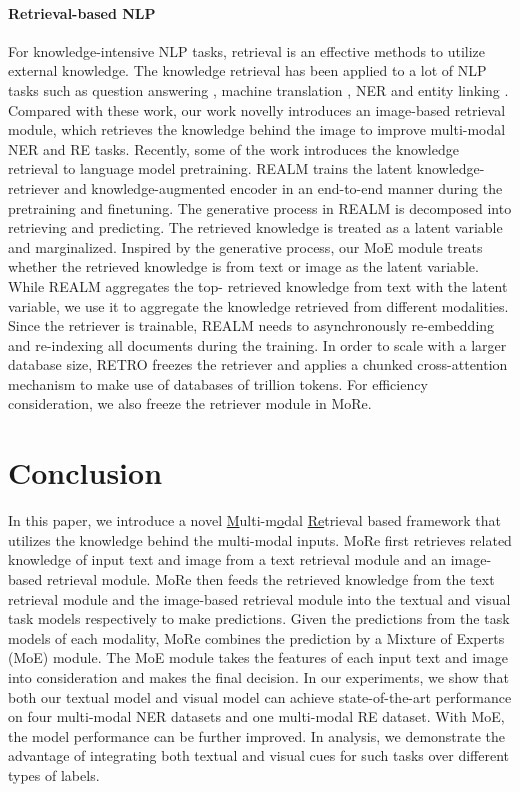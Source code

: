 \documentclass[11pt]{article}
\begin{document}
\paragraph{Retrieval-based NLP}
For knowledge-intensive NLP tasks, retrieval is an effective methods to utilize external knowledge. The knowledge retrieval has been applied to a lot of NLP tasks such as question answering \cite{liu2020k,karpukhin-etal-2020-dense, NEURIPS2020_6b493230,xu2021human, izacard-grave-2021-leveraging}, machine translation \cite{gu2018search,zhang-etal-2018-guiding,xu-etal-2020-boosting}, NER \cite{wang-etal-2021-improving,wang-etal-2022-damo,zhang-etal-2022-domain} and entity linking \cite{zhang-etal-2022-iclr,huang-etal-2022-nlpcc}. Compared with these work, our work novelly introduces an image-based retrieval module, which retrieves the knowledge behind the image to improve multi-modal NER and RE tasks. Recently, some of the work introduces the knowledge retrieval to language model pretraining. REALM \cite{guu2020realm} trains the latent knowledge-retriever and knowledge-augmented encoder in an end-to-end manner during the pretraining and finetuning. The generative process in REALM is decomposed into retrieving and predicting. The retrieved knowledge is treated as a latent variable and marginalized. Inspired by the generative process, our MoE module treats whether the retrieved knowledge is from text or image as the latent variable. While REALM aggregates the top- retrieved knowledge from text with the latent variable, we use it to aggregate the knowledge retrieved from different modalities. Since the retriever is trainable, REALM needs to asynchronously re-embedding and re-indexing all documents during the training. In order to scale with a larger database size, RETRO \cite{DBLP:journals/corr/abs-2112-04426} freezes the retriever and applies a chunked cross-attention mechanism to make use of databases of trillion tokens. For efficiency consideration, we also freeze the retriever module in MoRe. 

\section{Conclusion}
In this paper, we introduce a novel \underline{M}ulti-m\underline{o}dal \underline{Re}trieval based framework that utilizes the knowledge behind the multi-modal inputs. MoRe first retrieves related knowledge of input text and image from a text retrieval module and an image-based retrieval module. MoRe then feeds the retrieved knowledge from the text retrieval module and the image-based retrieval module into the textual and visual task models respectively to make predictions. Given the predictions from the task models of each modality, MoRe combines the prediction by a Mixture of Experts (MoE) module. The MoE module takes the features of each input text and image into consideration and makes the final decision. In our experiments, we show that both our textual model and visual model can achieve state-of-the-art performance on four multi-modal NER datasets and one multi-modal RE dataset. With MoE, the model performance can be further improved. In analysis, we demonstrate the advantage of integrating both textual and visual cues for such tasks over different types of labels. 
\end{document}
